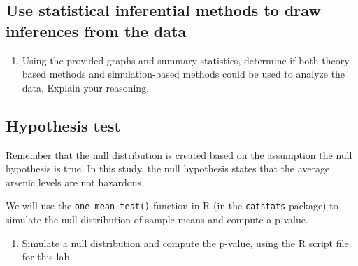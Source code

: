 \documentclass[
]{report}
\providecommand{\tightlist}{%
  \setlength{\itemsep}{0pt}\setlength{\parskip}{0pt}}
\begin{document}
\vspace{0.4in}

\subsection*{Use statistical inferential methods to draw inferences from the data}\label{use-statistical-inferential-methods-to-draw-inferences-from-the-data-1}

\begin{enumerate}
\def\labelenumi{\arabic{enumi}.}
\setcounter{enumi}{8}
\tightlist
\item
  Using the provided graphs and summary statistics, determine if both theory-based methods and simulation-based methods could be used to analyze the data. Explain your reasoning.
\end{enumerate}

\vspace{1in}

\subsection*{Hypothesis test}\label{hypothesis-test}

Remember that the null distribution is created based on the assumption the null hypothesis is true. In this study, the null hypothesis states that the average arsenic levels are not hazardous.

We will use the \texttt{one\_mean\_test()} function in R (in the \texttt{catstats} package) to simulate the null distribution of sample means and compute a p-value.

\newpage

\begin{enumerate}
\def\labelenumi{\arabic{enumi}.}
\setcounter{enumi}{9}
\tightlist
\item
  Simulate a null distribution and compute the p-value, using the R script file for this lab.
\end{enumerate}
\end{document}
